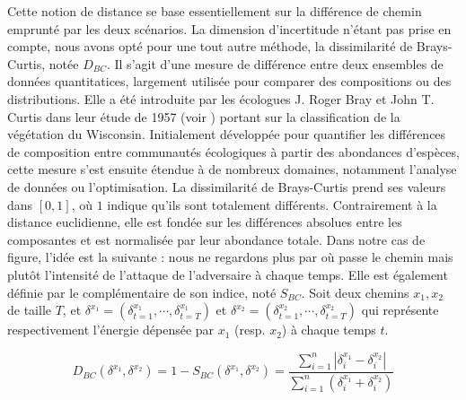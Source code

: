 \documentclass[12pt, a4paper, twoside]{report}
\numberwithin{equation}{section}
\begin{document}
	Cette notion de distance se base essentiellement sur la différence de chemin emprunté par les deux scénarios. La dimension d'incertitude n'étant pas prise en compte, nous avons opté pour une tout autre méthode, la dissimilarité de Brays-Curtis, notée $D_{BC}$. Il s'agit d'une mesure de différence entre deux ensembles de données quantitatices, largement utilisée pour comparer des compositions ou des distributions. Elle a été introduite par les écologues J. Roger Bray et John T. Curtis dans leur étude de 1957 (voir \cite{brays_curtis_fondement}) portant sur la classification de la végétation du Wisconsin. Initialement développée pour quantifier les différences de composition entre communautés écologiques à partir des abondances d'espèces, cette mesure s'est ensuite étendue à de nombreux domaines, notamment l'analyse de données ou l'optimisation. La dissimilarité de Brays-Curtis prend ses valeurs dans $[0, 1]$, où $1$ indique qu'ils sont totalement différents. Contrairement à la distance euclidienne, elle est fondée sur les différences absolues entre les composantes et est normalisée par leur abondance totale. Dans notre cas de figure, l'idée est la suivante : nous ne regardons plus par où passe le chemin mais plutôt l'intensité de l'attaque de l'adversaire à chaque temps. Elle est également définie par le complémentaire de son indice, noté $S_{BC}$. Soit deux chemins $x_1, x_2$ de taille $T$, et $\delta^{x_1}=(\delta_{t=1}^{x_1}, \cdots, \delta_{t=T}^{x_1})$ et $\delta^{x_2}=(\delta_{t=1}^{x_2}, \cdots, \delta_{t=T}^{x_2})$ qui représente respectivement l'énergie dépensée par $x_1$ (resp. $x_2$) à chaque temps $t$. 
	
	\begin{equation}
		D_{BC}(\delta^{x_1}, \delta^{x_2})=1-S_{BC}(\delta^{x_1}, \delta^{x_2})=\frac{\sum_{i=1}^n|\delta^{x_1}_i-\delta^{x_2}_i|}{\sum_{i=1}^n(\delta^{x_1}_i+\delta^{x_2}_i)}
	\end{equation}
	
\end{document}
